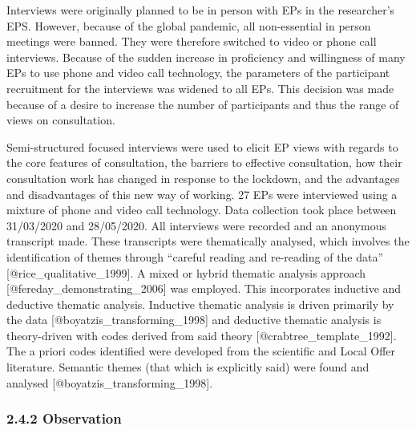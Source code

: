 \documentclass[
]{article}
\begin{document}
Interviews were originally planned to be in person with EPs in the
researcher's EPS. However, because of the global pandemic, all
non-essential in person meetings were banned. They were therefore
switched to video or phone call interviews. Because of the sudden
increase in proficiency and willingness of many EPs to use phone and
video call technology, the parameters of the participant recruitment for
the interviews was widened to all EPs. This decision was made because of
a desire to increase the number of participants and thus the range of
views on consultation.

Semi-structured focused interviews were used to elicit EP views with
regards to the core features of consultation, the barriers to effective
consultation, how their consultation work has changed in response to the
lockdown, and the advantages and disadvantages of this new way of
working. 27 EPs were interviewed using a mixture of phone and video call
technology. Data collection took place between 31/03/2020 and
28/05/2020. All interviews were recorded and an anonymous transcript
made. These transcripts were thematically analysed, which involves the
identification of themes through ``careful reading and re-reading of the
data'' {[}@rice\_qualitative\_1999{]}. A mixed or hybrid thematic
analysis approach {[}@fereday\_demonstrating\_2006{]} was employed. This
incorporates inductive and deductive thematic analysis. Inductive
thematic analysis is driven primarily by the data
{[}@boyatzis\_transforming\_1998{]} and deductive thematic analysis is
theory-driven with codes derived from said theory
{[}@crabtree\_template\_1992{]}. The a priori codes identified were
developed from the scientific and Local Offer literature. Semantic
themes (that which is explicitly said) were found and analysed
{[}@boyatzis\_transforming\_1998{]}.

\hypertarget{observation-1}{%
\subsubsection{2.4.2 Observation}\label{observation-1}}
\end{document}
